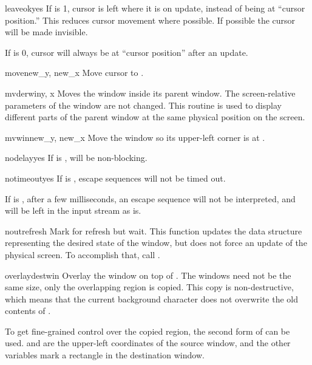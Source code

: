 \begin{methoddesc}[window]{leaveok}{yes}
If  is 1, cursor is left where it is on update, instead of
being at ``cursor position.''  This reduces cursor movement where
possible. If possible the cursor will be made invisible.

If  is 0, cursor will always be at ``cursor position'' after
an update.
\end{methoddesc}

\begin{methoddesc}[window]{move}{new_y, new_x}
Move cursor to .
\end{methoddesc}

\begin{methoddesc}[window]{mvderwin}{y, x}
Moves the window inside its parent window.  The screen-relative
parameters of the window are not changed.  This routine is used to
display different parts of the parent window at the same physical
position on the screen.
\end{methoddesc}

\begin{methoddesc}[window]{mvwin}{new_y, new_x}
Move the window so its upper-left corner is at
.
\end{methoddesc}

\begin{methoddesc}[window]{nodelay}{yes}
If  is ,  will be non-blocking.
\end{methoddesc}

\begin{methoddesc}[window]{notimeout}{yes}
If  is , escape sequences will not be timed out.

If  is , after a few milliseconds, an escape sequence
will not be interpreted, and will be left in the input stream as is.
\end{methoddesc}

\begin{methoddesc}[window]{noutrefresh}{}
Mark for refresh but wait.  This function updates the data structure
representing the desired state of the window, but does not force
an update of the physical screen.  To accomplish that, call 
.
\end{methoddesc}

\begin{methoddesc}[window]{overlay}{destwin}
Overlay the window on top of . The windows need not be
the same size, only the overlapping region is copied. This copy is
non-destructive, which means that the current background character
does not overwrite the old contents of .

To get fine-grained control over the copied region, the second form
of  can be used.  and  are
the upper-left coordinates of the source window, and the other variables
mark a rectangle in the destination window.
\end{methoddesc}

